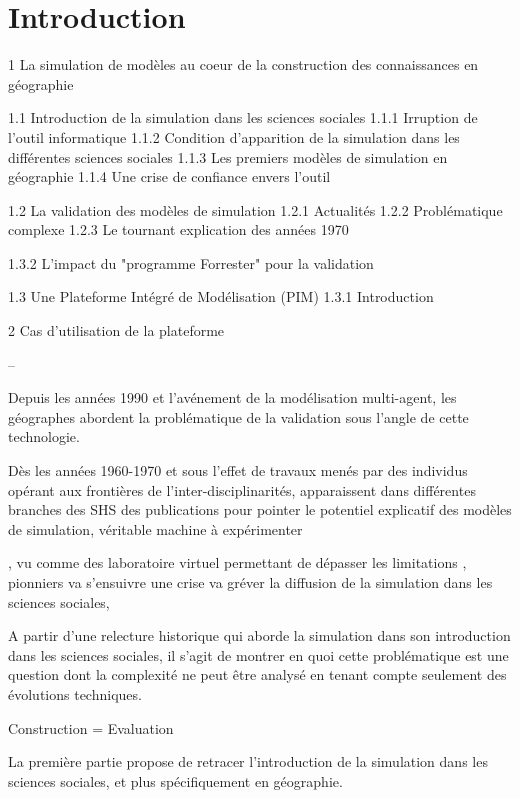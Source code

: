 
\chapter{Introduction}

\startcontents[chapters]
\Mprintcontents


1 La simulation de modèles au coeur de la construction des connaissances en géographie

1.1 Introduction de la simulation dans les sciences sociales 
	1.1.1 Irruption de l'outil informatique
	1.1.2 Condition d'apparition de la simulation dans les différentes sciences sociales
	1.1.3 Les premiers modèles de simulation en géographie
	1.1.4 Une crise de confiance envers l'outil

1.2 La validation des modèles de simulation
	1.2.1 Actualités
	1.2.2 Problématique complexe
	1.2.3 Le tournant explication des années 1970
	
	1.3.2 L'impact du "programme Forrester" pour la validation

1.3 Une Plateforme Intégré de Modélisation (PIM)
	1.3.1 Introduction

2 Cas d'utilisation de la plateforme

--

Depuis les années 1990 et l'avénement de la modélisation multi-agent, les géographes abordent la problématique de la validation sous l'angle de cette technologie.

Dès les années 1960-1970 et sous l'effet de travaux menés par des individus opérant aux frontières de l'inter-disciplinarités, apparaissent dans différentes branches des SHS des publications pour pointer le potentiel explicatif des modèles de simulation, véritable machine à expérimenter 

,  vu comme des laboratoire virtuel permettant de dépasser les limitations  ,  pionniers va s'ensuivre une crise va gréver la diffusion de la simulation dans les sciences sociales, 


A partir d'une relecture historique qui aborde la simulation dans son introduction dans les sciences sociales, il s'agit de montrer en quoi cette problématique est une question dont la complexité ne peut être analysé en tenant compte seulement des évolutions techniques.




Construction = Evaluation

La première partie propose de retracer l'introduction de la simulation dans les sciences sociales, et plus spécifiquement en géographie. 








\printbibliography[heading=subbibliography]

\stopcontents[chapters]
